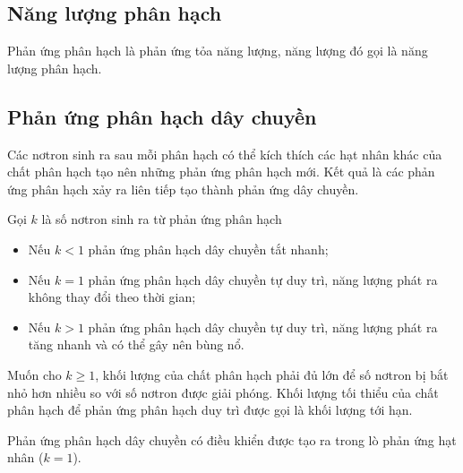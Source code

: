 \subsection{Năng lượng phân hạch}
	Phản ứng phân hạch là phản ứng tỏa năng lượng, năng lượng đó gọi là năng lượng phân hạch.
	\subsection{Phản ứng phân hạch dây chuyền}
	Các nơtron sinh ra sau mỗi phân hạch có thể kích thích các hạt nhân khác của chất phân hạch tạo nên những phản ứng phân hạch mới. Kết quả là các phản ứng phân hạch xảy ra liên tiếp tạo thành phản ứng dây chuyền.
	
	Gọi $k$ là số nơtron sinh ra từ phản ứng phân hạch
	\begin{itemize}
		\item Nếu $k < 1$ phản ứng phân hạch dây chuyền tắt nhanh;
		\item Nếu $k = 1$ phản ứng phân hạch dây chuyền tự duy trì, năng lượng phát ra không thay đổi theo thời gian;
		\item Nếu $k > 1$ phản ứng phân hạch dây chuyền tự duy trì, năng lượng phát ra tăng nhanh và có thể gây nên bùng nổ.
	\end{itemize}

	Muốn cho $k \geq 1$, khối lượng của chất phân hạch phải đủ lớn để số nơtron bị bắt nhỏ hơn nhiều so với số nơtron được giải phóng. Khối lượng tối thiểu của chất phân hạch để phản ứng phân hạch duy trì được gọi là khối lượng tới hạn.
	
	Phản ứng phân hạch dây chuyền có điều khiển được tạo ra trong lò phản ứng hạt nhân ($k=1$).